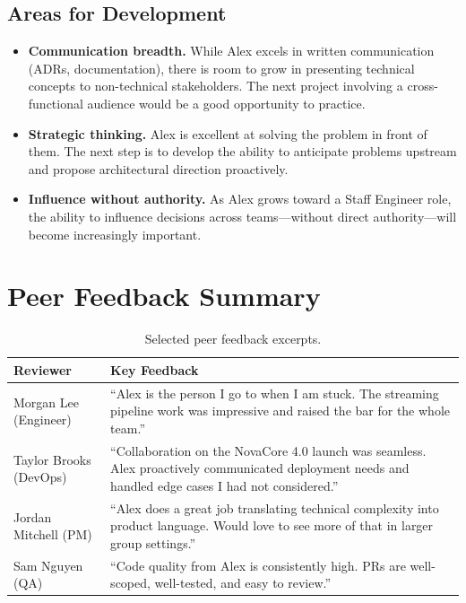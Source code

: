 \documentclass[
    language=english,
    doctype=performance-review,
    institution=none,
]{../../omnilatex}
\begin{document}
\subsection{Areas for Development}

\begin{itemize}
    \item \textbf{Communication breadth.} While Alex excels in written
        communication (ADRs, documentation), there is room to grow in
        presenting technical concepts to non-technical stakeholders.
        The next project involving a cross-functional audience would be a
        good opportunity to practice.
    \item \textbf{Strategic thinking.} Alex is excellent at solving the
        problem in front of them. The next step is to develop the ability
        to anticipate problems upstream and propose architectural direction
        proactively.
    \item \textbf{Influence without authority.} As Alex grows toward a
        Staff Engineer role, the ability to influence decisions across
        teams---without direct authority---will become increasingly
        important.
\end{itemize}

\section{Peer Feedback Summary}

\begin{table}[h]
    \centering
    \begin{tabular}{lp{8cm}}
        \toprule
        \textbf{Reviewer} & \textbf{Key Feedback} \\
        \midrule
        Morgan Lee (Engineer) & ``Alex is the person I go to when I am stuck.
            The streaming pipeline work was impressive and raised the bar for
            the whole team.'' \\
        Taylor Brooks (DevOps) & ``Collaboration on the NovaCore 4.0 launch
            was seamless. Alex proactively communicated deployment needs and
            handled edge cases I had not considered.'' \\
        Jordan Mitchell (PM) & ``Alex does a great job translating technical
            complexity into product language. Would love to see more of that
            in larger group settings.'' \\
        Sam Nguyen (QA) & ``Code quality from Alex is consistently high. PRs
            are well-scoped, well-tested, and easy to review.'' \\
        \bottomrule
    \end{tabular}
    \caption{Selected peer feedback excerpts.}
\end{table}
\end{document}
